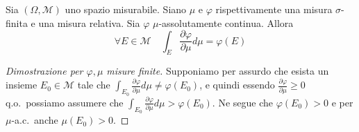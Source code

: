\begin{theorem}
    Sia \((\Omega, \mathcal{M})\) uno spazio misurabile. Siano \(\mu\) e
    \(\varphi\) rispettivamente una misura \(\sigma\)-finita e una misura
    relativa. Sia \(\varphi \) \(\mu\)-assolutamente continua. Allora
    \[
        \forall E \in \mathcal{M} \quad \int_E \frac{\partial \varphi }{\partial
        \mu} d\mu = \varphi(E)
    \]
\end{theorem}
\begin{proof}[Dimostrazione per \(\varphi , \mu\) misure finite]
    Supponiamo per assurdo che esista un insieme \(E_{0} \in \mathcal{M}\) tale
    che \(\int_{E_{0}} \frac{\partial \varphi }{\partial \mu} d\mu \neq \varphi
    (E_{0})\), e quindi essendo \(\frac{\partial \varphi }{\partial \mu} \ge 0\)
    q.o.~possiamo assumere che \(\int_{E_{0}} \frac{\partial \varphi }{\partial
    \mu} d\mu > \varphi (E_{0})\). Ne segue che \(\varphi (E_{0}) >0\) e per
    \(\mu\)-a.c.~anche \(\mu(E_{0}) > 0\).


\end{proof}
